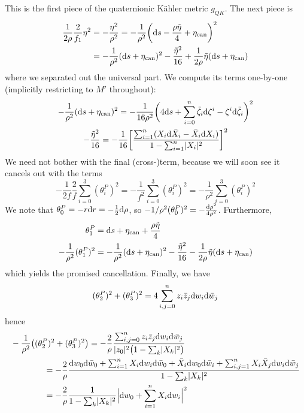 \documentclass[parskip=half]{scrartcl}
\begin{document}
This is the first piece of the quaternionic K\"ahler metric $g_{QK}$. The next piece is
\begin{align*}
	\frac{1}{2\rho}\frac{2}{f_1}\eta^2&=-\frac{\eta^2}{\rho^2}
	=-\frac{1}{\rho^2}\bigg(\mathrm{d} s - \frac{\rho\tilde\eta}{4}+\eta_\text{can}\bigg)^2\\
	&=-\frac{1}{\rho^2}(\mathrm{d} s +\eta_\text{can})^2-\frac{\tilde\eta^2}{16}
	+\frac{1}{2\rho}\tilde\eta(\mathrm{d} s +\eta_\text{can})
\end{align*}
where we separated out the universal part. We compute its terms one-by-one (implicitly restricting to $M'$ throughout):
\begin{gather*}
	-\frac{1}{\rho^2}(\mathrm{d} s + \eta_\text{can})^2
	=-\frac{1}{16\rho^2}\bigg(4\mathrm{d} s+ \sum_{i=0}^n \tilde\zeta_i \mathrm{d} \zeta^i - \zeta^i \mathrm{d} \tilde\zeta_i\bigg)^2\\
	-\frac{\tilde\eta^2}{16}
	=-\frac{1}{16}\bigg[\frac{\sum_{i=1}^n (X_i \mathrm{d} \bar X_i - \bar X_i \mathrm{d} X_i)}{1-\sum_{i=1}^n\lvert X_i \rvert^2}	\bigg]^2
\end{gather*}
We need not bother with the final (cross-)term, because we will soon see it cancels out with the terms
\begin{equation*}
	-\frac{1}{2f}\frac{2}{f}\sum_{i=0}^3(\theta_i^P)^2
	=-\frac{1}{f^2}\sum_{i=0}^3 (\theta^P_i)^2=-\frac{1}{\rho^2}\sum_{i=0}^3 (\theta^P_i)^2
\end{equation*}
We note that $\theta^P_0=-r\mathrm{d} r=-\frac{1}{2}\mathrm{d} \rho$, so $-1/\rho^2(\theta_0^P)^2=-\frac{\mathrm{d} \rho^2}{4\rho^2}$. Furthermore,
\begin{align*}
	\theta^P_1&=\mathrm{d} s + \eta_\text{can} +\frac{\rho\tilde\eta}{4} \\
	-\frac{1}{\rho^2}(\theta_1^P)^2
	&=-\frac{1}{\rho^2}(\mathrm{d} s +\eta_\text{can})^2-\frac{\tilde\eta^2}{16}
	-\frac{1}{2\rho}\tilde\eta(\mathrm{d} s + \eta_\text{can})
\end{align*}
which yields the promised cancellation. Finally, we have
\begin{equation*}
	(\theta^P_2)^2+(\theta^P_3)^2=4\sum_{i,j=0}^n z_i \bar z_j \mathrm{d} w_i \mathrm{d} \bar w_j
\end{equation*}
hence
\begin{align*}
	&-\frac{1}{\rho^2}\big((\theta^P_2)^2+(\theta^P_3)^2\big)=-\frac{2}{\rho}\frac{\sum_{i,j=0}^nz_i\bar z_j \mathrm{d} w_i \mathrm{d} \bar w_j}{\lvert z_0 \rvert^2\big(1-\sum_k \lvert X_k \rvert^2\big)}\\
	&\qquad\qquad=-\frac{2}{\rho}\frac{\mathrm{d} w_0 \mathrm{d} \bar w_0+\sum_{i=1}^n X_i \mathrm{d} w_i \mathrm{d} \bar w_0+\bar X_i \mathrm{d} w_0 \mathrm{d} \bar w_i
	+\sum_{i,j=1}^n X_i\bar X_j \mathrm{d} w_i \mathrm{d} \bar w_j}{1-\sum_k \lvert X_k \rvert^2}\\
	&\qquad\qquad=-\frac{2}{\rho}\frac{1}{1-\sum_k \lvert X_k \rvert^2}\Big|\mathrm{d} w_0 + \sum_{i=1}^n X_i \mathrm{d} w_i\Big|^2
\end{align*}
\end{document}
